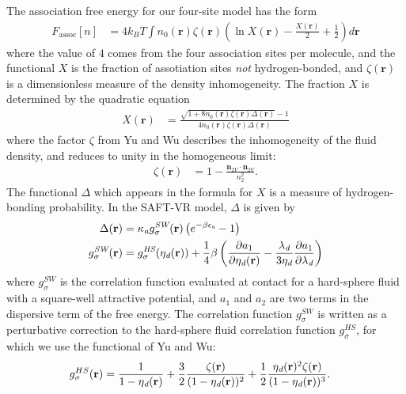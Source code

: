 \documentclass[letterpaper,twocolumn,amsmath,amssymb,prb]{revtex4-1}
\newcommand{\xx}{\textbf{r}}
\begin{document}
The association free energy for our four-site model has the form
\begin{align}
  F_\text{assoc}[n] &= 4 k_BT \int n_0(\xx)\zeta(\xx)
  \left(\ln X(\xx) - \frac{X(\xx)}{2} + \frac12\right) d\xx
\end{align}
where the value of $4$ comes from the four association sites per
molecule, and the functional $X$ is the fraction of assotiation sites
\emph{not} hydrogen-bonded, and $\zeta(\xx)$ is a dimensionless
measure of the density inhomogeneity.  The fraction $X$ is determined
by the quadratic equation
\begin{align}
  X(\xx) &= \frac{\sqrt{1 + 8n_0(\xx)\zeta(\xx)\Delta(\xx)} - 1}
  {4 n_0(\xx)\zeta(\xx)\Delta(\xx)}
\end{align}
where the factor $\zeta$ from
Yu and Wu\cite{yu2002fmt-dft-inhomogeneous-associating,
  fu2005vapor-liquid-dft} describes the inhomogeneity of the fluid
density, and reduces to unity in the homogeneous limit:
\begin{align}
  \zeta(\xx) &= 1 - \frac{\mathbf{n}_{2V}\cdot\mathbf{n}_{2V}}{n_2^2}.
\end{align}
The functional $\Delta$ which appears in the formula for $X$ is a
measure of hydrogen-bonding probability.  In the SAFT-VR
model\cite{gil-villegas-1997-SAFT-VR}, $\Delta$ is given by
\begin{align}
  \Delta(\xx) &= \kappaassoc g^\textit{SW}_\sigma(\xx)
  \left(e^{-\beta\epsilonassoc} - 1\right) \\
  g^\textit{SW}_\sigma(\xx) &= g^\textit{HS}_\sigma(\etadisp(\xx)) +
  \frac{1}{4}\beta\left(\frac{\partial a_1}{\partial \etadisp(\xx)} -
  \frac{\lambdadisp}{3 \etadisp}\frac{\partial a_1}{\partial \lambdadisp}\right)
\end{align}
where $g^\textit{SW}_\sigma$ is the correlation function evaluated at
contact for a hard-sphere fluid with a square-well attractive
potential, and $a_1$ and $a_2$ are two terms in the dispersive term of
the free energy.  The correlation function $g^\textit{SW}_\sigma$ is
written as a perturbative correction to the hard-sphere fluid correlation
function $g^\textit{HS}_\sigma$, for which we use the functional of Yu and
Wu\cite{yu2002fmt-dft-inhomogeneous-associating}:
\begin{align}
  g_\sigma^{HS}(\xx) &= \frac{1}{1-\etadisp(\xx)}
  +\frac32\frac{\zeta(\xx)}{(1-\etadisp(\xx))^2}
  + \frac12\frac{\etadisp(\xx)^2\zeta(\xx)}{(1-\etadisp(\xx))^3}.
\end{align}
\end{document}
